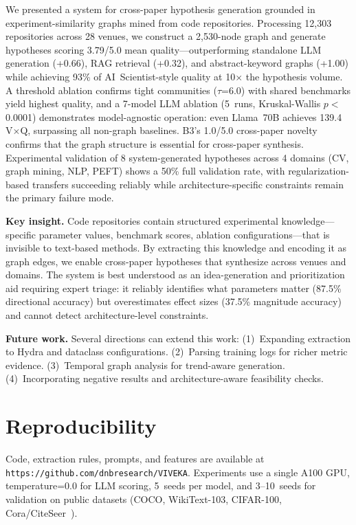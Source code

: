 \documentclass[conference]{IEEEtran}
\begin{document}
We presented a system for cross-paper hypothesis generation grounded in experiment-similarity graphs mined from code repositories.
Processing 12{,}303 repositories across 28 venues, we construct a 2{,}530-node graph and generate hypotheses scoring 3.79/5.0 mean quality---outperforming standalone LLM generation (+0.66), RAG retrieval (+0.32), and abstract-keyword graphs (+1.00) while achieving 93\% of AI~Scientist-style quality at 10$\times$ the hypothesis volume.
A threshold ablation confirms tight communities ($\tau$=6.0) with shared benchmarks yield highest quality, and a 7-model LLM ablation (5~runs, Kruskal-Wallis $p<$0.0001) demonstrates model-agnostic operation: even Llama~70B achieves 139.4 V$\times$Q, surpassing all non-graph baselines.
B3's 1.0/5.0 cross-paper novelty confirms that the graph structure is essential for cross-paper synthesis.
Experimental validation of 8 system-generated hypotheses across 4 domains (CV, graph mining, NLP, PEFT) shows a 50\% full validation rate, with regularization-based transfers succeeding reliably while architecture-specific constraints remain the primary failure mode.

\textbf{Key insight.}
Code repositories contain structured experimental knowledge---specific parameter values, benchmark scores, ablation configurations---that is invisible to text-based methods.
By extracting this knowledge and encoding it as graph edges, we enable cross-paper hypotheses that synthesize across venues and domains.
The system is best understood as an idea-generation and prioritization aid requiring expert triage: it reliably identifies what parameters matter (87.5\% directional accuracy) but overestimates effect sizes (37.5\% magnitude accuracy) and cannot detect architecture-level constraints.

\textbf{Future work.}
Several directions can extend this work:
(1)~Expanding extraction to Hydra and dataclass configurations.
(2)~Parsing training logs for richer metric evidence.
(3)~Temporal graph analysis for trend-aware generation.
(4)~Incorporating negative results and architecture-aware feasibility checks.

\balance

\section*{Reproducibility}
Code, extraction rules, prompts, and features are available at \texttt{https://github.com/dnbresearch/VIVEKA}.
Experiments use a single A100 GPU, temperature=0.0 for LLM scoring, 5~seeds per model, and 3--10~seeds for validation on public datasets (COCO, WikiText-103, CIFAR-100, Cora/CiteSeer~\cite{sen2008collective}).
\end{document}

